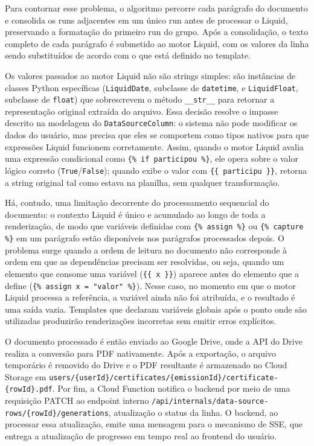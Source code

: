\documentclass[article,a4paper,12pt,brazil,sumario=tradicional]{abntex2}
\begin{document}
Para contornar esse problema, o algoritmo percorre cada parágrafo do documento e consolida os runs adjacentes em um único run antes de processar o Liquid, preservando a formatação do primeiro run do grupo. Após a consolidação, o texto completo de cada parágrafo é submetido ao motor Liquid, com os valores da linha sendo substituídos de acordo com o que está definido no template.

Os valores passados ao motor Liquid não são strings simples: são instâncias de classes Python específicas (\texttt{LiquidDate}, subclasse de \texttt{datetime}, e \texttt{LiquidFloat}, subclasse de \texttt{float}) que sobrescrevem o método \texttt{\_\_str\_\_} para retornar a representação original extraída do arquivo. Essa decisão resolve o impasse descrito na modelagem do \texttt{DataSourceColumn}: o sistema não pode modificar os dados do usuário, mas precisa que eles se comportem como tipos nativos para que expressões Liquid funcionem corretamente. Assim, quando o motor Liquid avalia uma expressão condicional como \texttt{\{\% if participou \%\}}, ele opera sobre o valor lógico correto (\texttt{True}/\texttt{False}); quando exibe o valor com \texttt{\{\{ participu \}\}}, retorna a string original tal como estava na planilha, sem qualquer transformação.

Há, contudo, uma limitação decorrente do processamento sequencial do documento: o contexto Liquid é único e acumulado ao longo de toda a renderização, de modo que variáveis definidas com \texttt{\{\% assign \%\}} ou \texttt{\{\% capture \%\}} em um parágrafo estão disponíveis nos parágrafos processados depois. O problema surge quando a ordem de leitura no documento não corresponde à ordem em que as dependências precisam ser resolvidas, ou seja, quando um elemento que consome uma variável (\texttt{\{\{ x \}\}}) aparece antes do elemento que a define (\texttt{\{\% assign x = "valor" \%\}}). Nesse caso, no momento em que o motor Liquid processa a referência, a variável ainda não foi atribuída, e o resultado é uma saída vazia. Templates que declaram variáveis globais após o ponto onde são utilizadas produzirão renderizações incorretas sem emitir erros explícitos.

O documento processado é então enviado ao Google Drive, onde a API do Drive realiza a conversão para PDF nativamente. Após a exportação, o arquivo temporário é removido do Drive e o PDF resultante é armazenado no Cloud Storage em \texttt{users/\{userId\}/certificates/\{emissionId\}/certificate-\{rowId\}.pdf}. Por fim, a Cloud Function notifica o backend por meio de uma requisição PATCH ao endpoint interno \texttt{/api/internals/data-source-rows/\{rowId\}/generations}, atualização o status da linha. O backend, ao processar essa atualização, emite uma mensagem para o mecanismo de SSE, que entrega a atualização de progresso em tempo real ao frontend do usuário.
\end{document}

